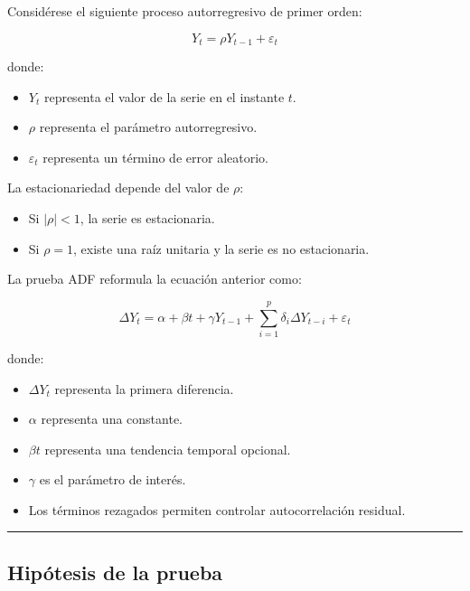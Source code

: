 \documentclass[11pt]{article}
\providecommand{\tightlist}{%
      \setlength{\itemsep}{0pt}\setlength{\parskip}{0pt}}
\begin{document}
Considérese el siguiente proceso autorregresivo de primer orden:

\[
Y_t = \rho Y_{t-1} + \varepsilon_t
\]

donde:

\begin{itemize}
\tightlist
\item
  \(Y_t\) representa el valor de la serie en el instante \(t\).
\item
  \(\rho\) representa el parámetro autorregresivo.
\item
  \(\varepsilon_t\) representa un término de error aleatorio.
\end{itemize}

La estacionariedad depende del valor de \(\rho\):

\begin{itemize}
\tightlist
\item
  Si \(|\rho| < 1\), la serie es estacionaria.
\item
  Si \(\rho = 1\), existe una raíz unitaria y la serie es no
  estacionaria.
\end{itemize}

La prueba ADF reformula la ecuación anterior como:

\[
\Delta Y_t = \alpha + \beta t + \gamma Y_{t-1}
+ \sum_{i=1}^{p}\delta_i \Delta Y_{t-i}
+ \varepsilon_t
\]

donde:

\begin{itemize}
\tightlist
\item
  \(\Delta Y_t\) representa la primera diferencia.
\item
  \(\alpha\) representa una constante.
\item
  \(\beta t\) representa una tendencia temporal opcional.
\item
  \(\gamma\) es el parámetro de interés.
\item
  Los términos rezagados permiten controlar autocorrelación residual.
\end{itemize}

\begin{center}\rule{0.5\linewidth}{0.5pt}\end{center}

\hypertarget{hipuxf3tesis-de-la-prueba}{%
\subsection{Hipótesis de la prueba}\label{hipuxf3tesis-de-la-prueba}}
\end{document}

